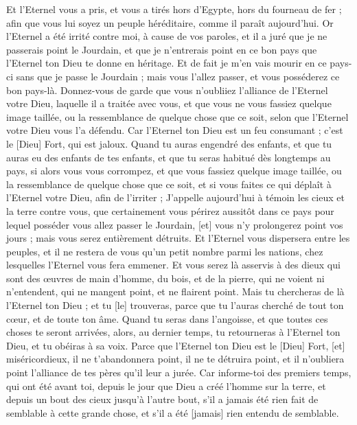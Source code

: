 \begin{multicols}{2}
Et l'Eternel vous a pris, et vous a tirés hors d'Egypte, hors du fourneau de fer ; afin que vous lui soyez un peuple héréditaire, comme il paraît aujourd'hui.
Or l'Eternel a été irrité contre moi, à cause de vos paroles, et il a juré que je ne passerais point le Jourdain, et que je n'entrerais point en ce bon pays que l'Eternel ton Dieu te donne en héritage.
Et de fait je m'en vais mourir en ce pays-ci sans que je passe le Jourdain ; mais vous l'allez passer, et vous posséderez ce bon pays-là.
Donnez-vous de garde que vous n'oubliiez l'alliance de l'Eternel votre Dieu, laquelle il a traitée avec vous, et que vous ne vous fassiez quelque image taillée, ou la ressemblance de quelque chose que ce soit, selon que l'Eternel votre Dieu vous l'a défendu.
Car l'Eternel ton Dieu est un feu consumant ; c'est le [Dieu] Fort, qui est jaloux.
Quand tu auras engendré des enfants, et que tu auras eu des enfants de tes enfants, et que tu seras habitué dès longtemps au pays, si alors vous vous corrompez, et que vous fassiez quelque image taillée, ou la ressemblance de quelque chose que ce soit, et si vous faites ce qui déplaît à l'Eternel votre Dieu, afin de l'irriter ;
J'appelle aujourd'hui à témoin les cieux et la terre contre vous, que certainement vous périrez aussitôt dans ce pays pour lequel posséder vous allez passer le Jourdain, [et] vous n'y prolongerez point vos jours ; mais vous serez entièrement détruits.
Et l'Eternel vous dispersera entre les peuples, et il ne restera de vous qu'un petit nombre parmi les nations, chez lesquelles l'Eternel vous fera emmener.
Et vous serez là asservis à des dieux qui sont des œuvres de main d'homme, du bois, et de la pierre, qui ne voient ni n'entendent, qui ne mangent point, et ne flairent point.
Mais tu chercheras de là l'Eternel ton Dieu ; et tu [le] trouveras, parce que tu l'auras cherché de tout ton cœur, et de toute ton âme.
Quand tu seras dans l'angoisse, et que toutes ces choses te seront arrivées, alors, au dernier temps, tu retourneras à l'Eternel ton Dieu, et tu obéiras à sa voix.
Parce que l'Eternel ton Dieu est le [Dieu] Fort, [et] miséricordieux, il ne t'abandonnera point, il ne te détruira point, et il n'oubliera point l'alliance de tes pères qu'il leur a jurée.
Car informe-toi des premiers temps, qui ont été avant toi, depuis le jour que Dieu a créé l'homme sur la terre, et depuis un bout des cieux jusqu'à l'autre bout, s'il a jamais été rien fait de semblable à cette grande chose, et s'il a été [jamais] rien entendu de semblable.

\end{multicols}
